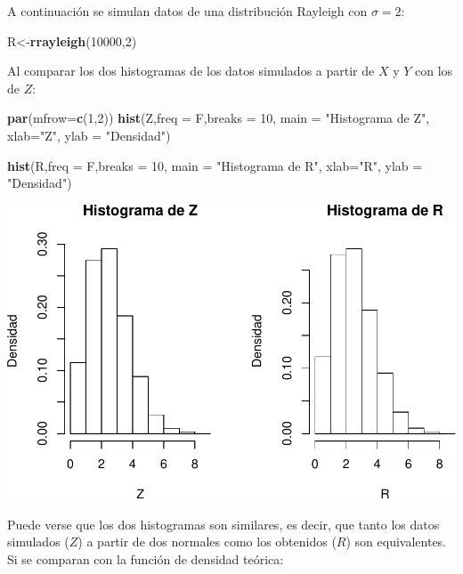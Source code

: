 \documentclass[]{article}
\newenvironment{Shaded}{\begin{snugshade}}{\end{snugshade}}
\newcommand{\KeywordTok}[1]{\textcolor[rgb]{0.13,0.29,0.53}{\textbf{#1}}}
\newcommand{\DataTypeTok}[1]{\textcolor[rgb]{0.13,0.29,0.53}{#1}}
\newcommand{\DecValTok}[1]{\textcolor[rgb]{0.00,0.00,0.81}{#1}}
\newcommand{\StringTok}[1]{\textcolor[rgb]{0.31,0.60,0.02}{#1}}
\newcommand{\NormalTok}[1]{#1}
\begin{document}
A continuación se simulan datos de una distribución Rayleigh con
\(\sigma=2\):

\begin{Shaded}
\begin{Highlighting}[]
\NormalTok{R<-}\KeywordTok{rrayleigh}\NormalTok{(}\DecValTok{10000}\NormalTok{,}\DecValTok{2}\NormalTok{)}
\end{Highlighting}
\end{Shaded}

Al comparar los dos histogramas de los datos simulados a partir de \(X\)
y \(Y\) con los de \(Z\):

\begin{Shaded}
\begin{Highlighting}[]
\KeywordTok{par}\NormalTok{(}\DataTypeTok{mfrow=}\KeywordTok{c}\NormalTok{(}\DecValTok{1}\NormalTok{,}\DecValTok{2}\NormalTok{))}
\KeywordTok{hist}\NormalTok{(Z,}\DataTypeTok{freq =}\NormalTok{ F,}\DataTypeTok{breaks =} \DecValTok{10}\NormalTok{, }\DataTypeTok{main =} \StringTok{"Histograma de Z"}\NormalTok{, }\DataTypeTok{xlab=}\StringTok{"Z"}\NormalTok{, }\DataTypeTok{ylab =} \StringTok{"Densidad"}\NormalTok{)}


\KeywordTok{hist}\NormalTok{(R,}\DataTypeTok{freq =}\NormalTok{ F,}\DataTypeTok{breaks =} \DecValTok{10}\NormalTok{, }\DataTypeTok{main =} \StringTok{"Histograma de R"}\NormalTok{, }\DataTypeTok{xlab=}\StringTok{"R"}\NormalTok{, }\DataTypeTok{ylab =} \StringTok{"Densidad"}\NormalTok{)}
\end{Highlighting}
\end{Shaded}

\includegraphics[width=0.8\linewidth]{notebook_simulaciones_files/figure-latex/unnamed-chunk-4-1}

Puede verse que los dos histogramas son similares, es decir, que tanto
los datos simulados (\(Z\)) a partir de dos normales como los obtenidos
(\(R\)) son equivalentes. Si se comparan con la función de densidad
teórica:
\end{document}
